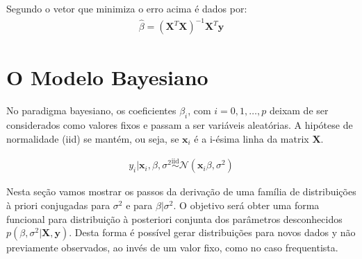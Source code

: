 \documentclass[12pt,letterpaper]{article}
\newcommand{\bd}[1]{\boldsymbol{#1}}
\newcommand{\norm}{\mathcal{N}}
\newcommand{\iid}{\overset{\text{iid}}{\sim}}
\begin{document}
	Segundo \cite{degroot2012probability} o vetor que minimiza o erro acima é dados por:
	\begin{align}\hat\beta=(\bd X^T\bd X)^{-1}\bd X^T\bd y\label{betafreq}\end{align}
	
\section{O Modelo Bayesiano}
	
	No paradigma bayesiano, os coeficientes $\beta_i$, com $i=0,1,\ldots,p$ deixam de ser considerados como valores fixos e passam a ser variáveis aleatórias. A hipótese de normalidade (iid) se mantém, ou seja, se $\bd x_i$ é a i-ésima linha da matrix $\bd X$. 
	
	\begin{align}y_i|\bd x_i,\beta,\sigma^2\iid\norm(\bd x_i\beta,\sigma^2)\label{lik}
	\end{align}
	
	Nesta seção vamos mostrar os passos da derivação de uma família de distribuições à priori conjugadas para $\sigma^2$ e para $\beta|\sigma^2$. O objetivo será obter uma forma funcional para distribuição à posteriori conjunta dos parâmetros desconhecidos $p(\beta,\sigma^2|\bd X,\bd y)$.
	Desta forma é possível gerar distribuições para novos dados y não previamente observados, ao invés de um valor fixo, como no caso frequentista.
	
\end{document}
